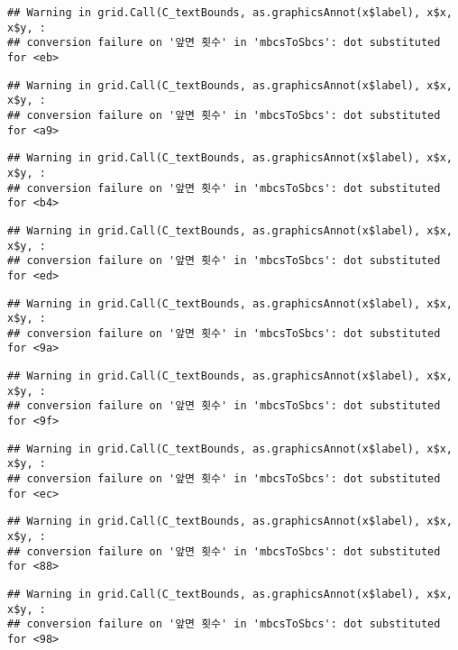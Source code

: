 \documentclass[]{book}
\begin{document}
\begin{verbatim}
## Warning in grid.Call(C_textBounds, as.graphicsAnnot(x$label), x$x, x$y, :
## conversion failure on '앞면 횟수' in 'mbcsToSbcs': dot substituted for <eb>
\end{verbatim}

\begin{verbatim}
## Warning in grid.Call(C_textBounds, as.graphicsAnnot(x$label), x$x, x$y, :
## conversion failure on '앞면 횟수' in 'mbcsToSbcs': dot substituted for <a9>
\end{verbatim}

\begin{verbatim}
## Warning in grid.Call(C_textBounds, as.graphicsAnnot(x$label), x$x, x$y, :
## conversion failure on '앞면 횟수' in 'mbcsToSbcs': dot substituted for <b4>
\end{verbatim}

\begin{verbatim}
## Warning in grid.Call(C_textBounds, as.graphicsAnnot(x$label), x$x, x$y, :
## conversion failure on '앞면 횟수' in 'mbcsToSbcs': dot substituted for <ed>
\end{verbatim}

\begin{verbatim}
## Warning in grid.Call(C_textBounds, as.graphicsAnnot(x$label), x$x, x$y, :
## conversion failure on '앞면 횟수' in 'mbcsToSbcs': dot substituted for <9a>
\end{verbatim}

\begin{verbatim}
## Warning in grid.Call(C_textBounds, as.graphicsAnnot(x$label), x$x, x$y, :
## conversion failure on '앞면 횟수' in 'mbcsToSbcs': dot substituted for <9f>
\end{verbatim}

\begin{verbatim}
## Warning in grid.Call(C_textBounds, as.graphicsAnnot(x$label), x$x, x$y, :
## conversion failure on '앞면 횟수' in 'mbcsToSbcs': dot substituted for <ec>
\end{verbatim}

\begin{verbatim}
## Warning in grid.Call(C_textBounds, as.graphicsAnnot(x$label), x$x, x$y, :
## conversion failure on '앞면 횟수' in 'mbcsToSbcs': dot substituted for <88>
\end{verbatim}

\begin{verbatim}
## Warning in grid.Call(C_textBounds, as.graphicsAnnot(x$label), x$x, x$y, :
## conversion failure on '앞면 횟수' in 'mbcsToSbcs': dot substituted for <98>
\end{verbatim}
\end{document}
